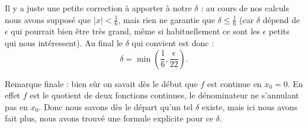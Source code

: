 {{Il y a juste une petite correction à apporter à notre $\delta$ : au cours de nos calculs
nous avons supposé que $|x| < \frac 16$, mais rien ne garantie que $\delta \le \frac 16$
(car $\delta$ dépend de $\epsilon$ qui pourrait bien être très grand, même
si habituellement ce sont les $\epsilon$ petits qui nous intéressent).
Au final le $\delta$ qui convient est donc :
$$\delta = \min (\frac 16, \frac{\epsilon}{22}).$$

\bigskip

Remarque finale :
bien sûr on savait dès le début que $f$ est continue en $x_0=0$. En effet
$f$ est le quotient de deux fonctions continues, le dénominateur ne s'annulant
pas en $x_0$. Donc nous savons dès le départ qu'un tel $\delta$ existe,
mais ici nous avons fait plus, nous avons trouvé une formule explicite pour ce $\delta$.
}
}
